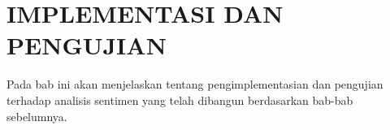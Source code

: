 \chapter{IMPLEMENTASI DAN PENGUJIAN}

%

\vspace{4.5pt}
Pada bab ini akan menjelaskan tentang pengimplementasian dan pengujian terhadap analisis sentimen yang telah dibangun berdasarkan bab-bab sebelumnya.

\newpage